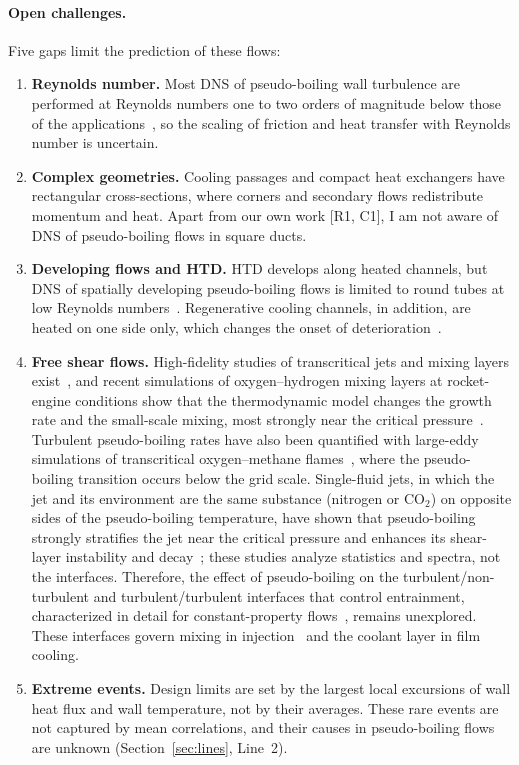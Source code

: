 \documentclass[11pt]{article}
\begin{document}
\paragraph{Open challenges.} Five gaps limit the prediction of these flows:
\begin{enumerate}[label=(\roman*)]
  \item \textbf{Reynolds number.} Most DNS of pseudo-boiling wall turbulence are performed at
  Reynolds numbers one to two orders of magnitude below those of the
  applications~\cite{Li2025}, so the scaling of friction and heat transfer with Reynolds
  number is uncertain.
  \item \textbf{Complex geometries.} Cooling passages and compact heat exchangers have
  rectangular cross-sections, where corners and secondary flows redistribute momentum and
  heat. Apart from our own work [R1, C1], I am not aware of DNS of pseudo-boiling flows in
  square ducts.
  \item \textbf{Developing flows and HTD.} HTD develops along heated channels, but DNS of
  spatially developing pseudo-boiling flows is limited to round tubes at low Reynolds
  numbers~\cite{Bae2005,Zhao2021}. Regenerative cooling channels, in addition, are heated on
  one side only, which changes the onset of deterioration~\cite{Nasuti2021}.
  \item \textbf{Free shear flows.} High-fidelity studies of transcritical jets and mixing
  layers exist~\cite{Ries2017,SharanBellan2021,PobladorIbanez2026}, and recent simulations of
  oxygen--hydrogen mixing layers at rocket-engine conditions show that the thermodynamic model
  changes the growth rate and the small-scale mixing, most strongly near the critical
  pressure~\cite{Cavalieri2026}. Turbulent pseudo-boiling rates have also been quantified with
  large-eddy simulations of transcritical oxygen--methane flames~\cite{Cavalieri2025}, where the
  pseudo-boiling transition occurs below the grid scale. Single-fluid jets, in which the jet and its
  environment are the same substance (nitrogen or CO$_2$) on opposite sides of the
  pseudo-boiling temperature, have shown that pseudo-boiling strongly stratifies the jet near the
  critical pressure and enhances its shear-layer instability and decay~\cite{Lapenna2019,Ream2025}; these studies analyze statistics and
  spectra, not the interfaces. Therefore, the effect of
  pseudo-boiling on the turbulent/non-turbulent and turbulent/turbulent interfaces that
  control entrainment, characterized in detail for constant-property
  flows~\cite{Silva2018,Alves2025}, remains unexplored. These interfaces govern mixing in
  injection~\cite{JofreUrzay2021} and the coolant layer in film cooling.
  \item \textbf{Extreme events.} Design limits are set by the largest local excursions of
  wall heat flux and wall temperature, not by their averages. These rare events are not
  captured by mean correlations, and their causes in pseudo-boiling flows are unknown
  (Section~\ref{sec:lines}, Line~2).
\end{enumerate}
\end{document}
